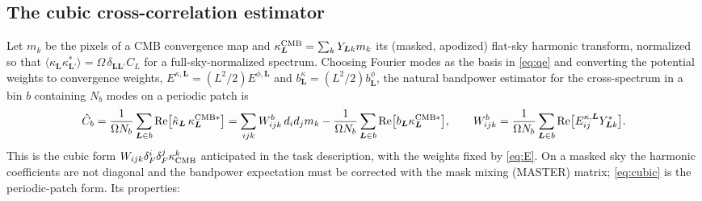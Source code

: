 \documentclass[11pt,a4paper]{article}
\newcommand{\dF}{\delta_F}
\newcommand{\vL}{\bm{L}}
\newcommand{\kcmb}{\kappa_{\rm CMB}}
\begin{document}
\subsection{The cubic cross-correlation estimator}
\label{sec:cubic}

Let $m_k$ be the pixels of a CMB convergence map and $\kappa^{\rm CMB}_{\vL}=\sum_kY_{\vL k}m_k$ its (masked, apodized) flat-sky harmonic transform, normalized so that $\langle\kappa_{\vL}\kappa^*_{\vL'}\rangle=\Omega\,\delta_{\vL\vL'}C_L$ for a full-sky-normalized spectrum. Choosing Fourier modes as the basis in \eqref{eq:qe} and converting the potential weights to convergence weights, $E^{\kappa,\vL}=(L^2/2)E^{\phi,\vL}$ and $b^{\kappa}_{\vL}=(L^2/2)b^{\phi}_{\vL}$, the natural bandpower estimator for the cross-spectrum in a bin $b$ containing $N_b$ modes on a periodic patch is
\begin{equation}
\hat C_b=\frac{1}{\Omega N_b}\sum_{\vL\in b}\mathrm{Re}\big[\hat\kappa_{\vL}\,\kappa^{{\rm CMB}*}_{\vL}\big]
=\sum_{ijk}W^b_{ijk}\,d_id_jm_k-\frac{1}{\Omega N_b}\sum_{\vL\in b}\mathrm{Re}\big[b_{\vL}\kappa^{{\rm CMB}*}_{\vL}\big],
\qquad
W^b_{ijk}=\frac{1}{\Omega N_b}\sum_{\vL\in b}\mathrm{Re}\big[E^{\kappa,\vL}_{ij}Y^*_{\vL k}\big].
\label{eq:cubic}
\end{equation}
This is the cubic form $W_{ijk}\dF^i\dF^j\kcmb^k$ anticipated in the task description, with the weights fixed by \eqref{eq:E}. On a masked sky the harmonic coefficients are not diagonal and the bandpower expectation must be corrected with the mask mixing (MASTER) matrix; \eqref{eq:cubic} is the periodic-patch form. Its properties:
\end{document}
